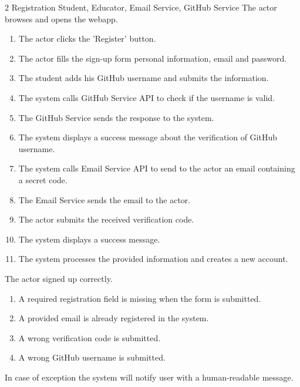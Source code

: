 \usecase
{2}
{Registration} %
{Student, Educator, Email Service, GitHub Service} %
{The actor browses and opens the webapp.} %
{ %
    \begin{enumerate}
        \item The actor clicks the 'Register' button.
        \item The actor fills the sign-up form personal information, email and password.
        \item The student adds his GitHub username and submits the information.
        \item The system calls GitHub Service API to check if the username is valid.
        \item The GitHub Service sends the response to the system.
        \item The system displays a success message about the verification of GitHub username.
        \item The system calls Email Service API to send to the actor an email containing a secret code.
        \item The Email Service sends the email to the actor.
        \item The actor submits the received verification code.
        \item The system displays a success message.
        \item The system processes the provided information and creates a new account.
    \end{enumerate}
}
{The actor signed up correctly.} %
{ %
    \begin{enumerate}
        \item A required registration field is missing when the form is submitted.
        \item A provided email is already registered in the system.
        \item A wrong verification code is submitted.
        \item A wrong GitHub username is submitted.
    \end{enumerate}
}
{ %
In case of exception the system will notify user with a human-readable message.
}

